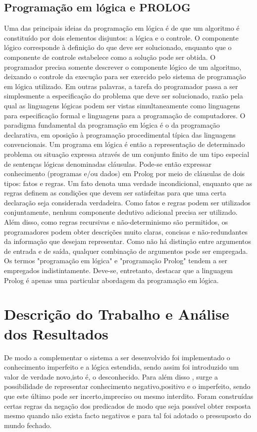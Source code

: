 \documentclass[25pt]{article}
\begin{document}
\subsection{Programação em lógica e PROLOG}

Uma das principais ideias da programação em lógica é de que um algoritmo é constituído por dois
elementos disjuntos: a lógica e o controle. O componente lógico corresponde à definição do que deve
ser solucionado, enquanto que o componente de controle estabelece como a solução pode ser obtida.
O programador precisa somente descrever o componente lógico de um algoritmo, deixando o controle
da execução para ser exercido pelo sistema de programação em lógica utilizado. Em outras palavras, a
tarefa do programador passa a ser simplesmente a especificação do problema que deve ser solucionado, razão pela qual as
linguagens lógicas podem ser vistas simultaneamente como linguagens para
especificação formal e linguagens para a programação de computadores.
O paradigma fundamental da programação em lógica é o da programação declarativa, em oposição à
programação procedimental típica das linguagens convencionais.
Um programa em lógica é então a representação de determinado problema ou situação expressa através de um conjunto finito
de um tipo especial de sentenças lógicas denominadas cláusulas.
Pode-se então expressar conhecimento (programas e/ou dados) em Prolog por meio de cláusulas de
dois tipos: fatos e regras. Um fato denota uma verdade incondicional, enquanto que as regras definem as condições que devem ser satisfeitas para que
uma certa declaração seja considerada verdadeira. Como fatos e regras podem ser utilizados conjuntamente, nenhum componente
dedutivo adicional precisa ser utilizado. Além disso, como regras recursivas e não-determinismo são permitidos, os programadores podem obter
descrições muito claras, concisas e não-redundantes da informação que desejam representar. Como não há distinção entre argumentos
de entrada e de saída, qualquer combinação de argumentos pode ser empregada.
Os termos "programação em lógica" e "programação Prolog" tendem a ser empregados indistintamente. Deve-se, entretanto, destacar
que a linguagem Prolog é apenas uma particular abordagem da
programação em lógica.
\newpage

\section{Descrição do Trabalho e Análise dos Resultados}

De modo a complementar o sistema a ser desenvolvido foi implementado o conhecimento imperfeito e a lógica estendida, sendo assim
foi introduzido um valor de verdade novo,isto é, o desconhecido.
Para além disso , surge a possibilidade de representar conhecimento negativo,positivo e o imperfeito, sendo que este último pode ser
incerto,impreciso ou mesmo interdito. 
Foram construídas certas regras da negação dos predicados de modo que seja possível obter resposta mesmo quando não exista facto negativos e para
tal foi adotado o pressuposto do mundo fechado.
\end{document}
